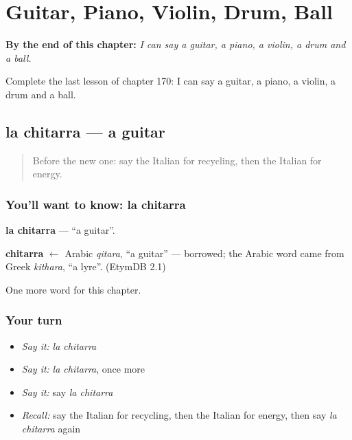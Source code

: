 
\chapter{Guitar, Piano, Violin, Drum, Ball}
\label{ch:it-guitar-piano-violin-drum-ball}

\begin{chapteropening}
\textbf{By the end of this chapter:} \emph{I can say a guitar, a piano, a violin, a drum and a ball.}

Complete the last lesson of chapter 170: I can say a guitar, a piano, a violin, a drum and a ball.
\end{chapteropening}

\section[la chitarra]{la chitarra — a guitar}

\label{lesson:IT-C170-chitarra}



\begin{quote}
Before the new one: say the Italian for recycling, then the Italian for energy.
\end{quote}

\subsection*{You'll want to know: la chitarra}
\textbf{la chitarra} — \textquotedblleft{}a guitar\textquotedblright{}.

\begin{cousinweb}
\textbf{chitarra} $\leftarrow$ Arabic \emph{qitara}, \textquotedblleft{}a guitar\textquotedblright{} — borrowed; the Arabic word came from Greek \emph{kithara}, \textquotedblleft{}a lyre\textquotedblright{}. (EtymDB 2.1)
\end{cousinweb}

\begin{grammarlens}[title={What you've built}]
One more word for this chapter.
\end{grammarlens}

\subsection*{Your turn}
\begin{itemize}
\raggedright
  \item \emph{Say it:} \emph{la chitarra}
  \item \emph{Say it:} \emph{la chitarra}, once more
  \item \emph{Say it:} say \emph{la chitarra}
  \item \emph{Recall:} say the Italian for recycling, then the Italian for energy, then say \emph{la chitarra} again
\end{itemize}

